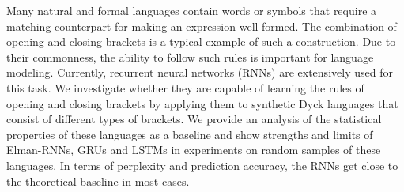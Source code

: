 Many natural and formal languages contain words or symbols that require a matching counterpart for making an expression well-formed. The combination of opening and closing brackets is a typical example of such a construction. Due to their commonness, the ability to follow such rules is important for language modeling. Currently, recurrent neural networks (RNNs) are extensively used for this task. We investigate whether they are capable of learning the rules of opening and closing brackets by applying them to synthetic Dyck languages that consist of different types of brackets. We provide an analysis of the statistical properties of these languages as a baseline and show strengths and limits of Elman-RNNs, GRUs and LSTMs in experiments on random samples of these languages. In terms of perplexity and prediction accuracy, the RNNs get close to the theoretical baseline in most cases.
